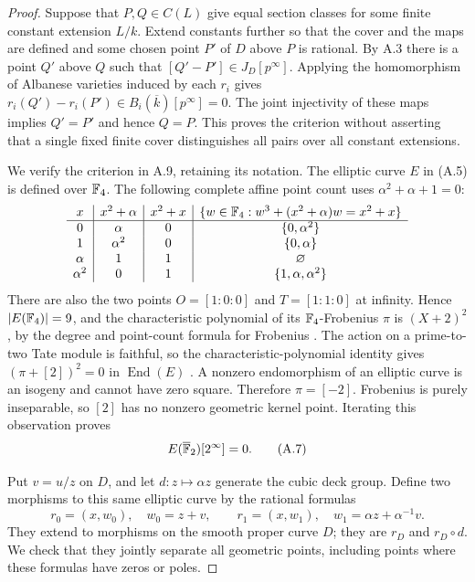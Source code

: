 \begin{proof}
Suppose that $P,Q\in C(L)$ give equal section classes for some
finite constant extension $L/k$. Extend constants further so that
the cover and the maps are defined and some chosen point $P'$ of
$D$ above $P$ is rational. By A.3 there is a point $Q'$ above $Q$
such that $[Q'-P']\in J_D[p^\infty]$. Applying the homomorphism
of Albanese varieties induced by each $r_i$ gives
$r_i(Q')-r_i(P')\in B_i(\overline k)[p^\infty]=0$.
The joint injectivity of these maps implies $Q'=P'$ and hence
$Q=P$. This proves the criterion without asserting that a
single fixed finite cover distinguishes all pairs over all
constant extensions.

We verify the criterion in A.9, retaining its notation. The
elliptic curve $E$ in (A.5) is defined over $\mathbb F_4$. The following
complete affine point count uses $\alpha^2+\alpha+1=0$:
\[
\begin{array}{c|c|c|c}
 x&x^2+\alpha&x^2+x&\{w\in\mathbb F_4:w^3+(x^2+\alpha)w=x^2+x\}\\
 \hline
 0&\alpha&0&\{0,\alpha^2\}\\
 1&\alpha^2&0&\{0,\alpha\}\\
 \alpha&1&1&\varnothing\\
 \alpha^2&0&1&\{1,\alpha,\alpha^2\}
\end{array}
\]
There are also the two points $O=[1:0:0]$ and
$T=[1:1:0]$ at infinity. Hence $|E(\mathbb F_4)|=9$, and the
characteristic polynomial of its $\mathbb F_4$-Frobenius $\pi$ is
$(X+2)^2$, by the degree and point-count formula for Frobenius
\citep[II, Theorem 1.1]{A_Milne2008}. The action on a prime-to-two
Tate module is faithful, so the characteristic-polynomial
identity gives $(\pi+[2])^2=0$ in $\operatorname{End}(E)$
\citep[I, Theorem 10.15]{A_Milne2008}.
A nonzero endomorphism of an elliptic curve is an isogeny and
cannot have zero square. Therefore $\pi=[-2]$. Frobenius is
purely inseparable, so $[2]$ has no nonzero geometric kernel
point. Iterating this observation proves
\[
 E(\overline{\mathbb F}_2)[2^\infty]=0.                                  \tag{A.7}
\]

Put $v=u/z$ on $D$, and let $d:z\mapsto\alpha z$ generate the
cubic deck group. Define two morphisms to this same elliptic
curve by the rational formulas
\[
 r_0=(x,w_0),\quad w_0=z+v,
 \qquad
 r_1=(x,w_1),\quad w_1=\alpha z+\alpha^{-1}v.
\]
They extend to morphisms on the smooth proper curve $D$; they
are $r_D$ and $r_D\circ d$. We check that they jointly separate
all geometric points, including points where these formulas
have zeros or poles.


\end{proof}
